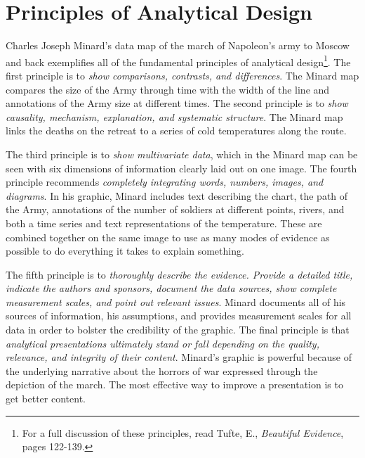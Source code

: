 \documentclass{tufte-handout}
\begin{document}
\section{Principles of Analytical Design}
Charles Joseph Minard's data map of the march of Napoleon's army to Moscow and back exemplifies all of the fundamental principles of analytical design\footnote{For a full discussion of these principles, read Tufte, E., \textit{Beautiful Evidence}, pages 122-139.}. The first principle is to \textit{show comparisons, contrasts, and differences}. The Minard map compares the size of the Army through time with the width of the line and annotations of the Army size at different times. The second principle is to \textit{show causality, mechanism, explanation, and systematic structure}. The Minard map links the deaths on the retreat to a series of cold temperatures along the route.

The third principle is to \textit{show multivariate data}, which in the Minard map can be seen with six dimensions of information clearly laid out on one image. The fourth principle recommends \textit{completely integrating words, numbers, images, and diagrams}. In his graphic, Minard includes text describing the chart, the path of the Army, annotations of the number of soldiers at different points, rivers, and both a time series and text representations of the temperature. These are combined together on the same image to use as many modes of evidence as possible to do everything it takes to explain something. 

The fifth principle is to \textit{thoroughly describe the evidence. Provide a detailed title, indicate the authors and sponsors, document the data sources, show complete measurement scales, and point out relevant issues}. Minard documents all of his sources of information, his assumptions, and provides measurement scales for all data in order to bolster the credibility of the graphic. The final principle is that \textit{analytical presentations ultimately stand or fall depending on the quality, relevance, and integrity of their content}. Minard's graphic is powerful because of the underlying narrative about the horrors of war expressed through the depiction of the march. The most effective way to improve a presentation is to get better content.
\end{document}
